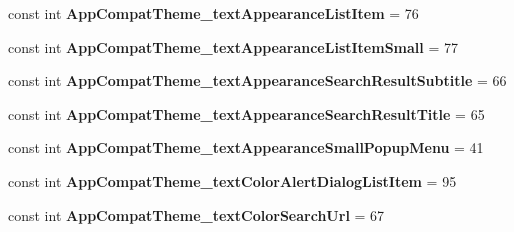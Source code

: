 \begin{DoxyCompactItemize}
\item 
\mbox{\label{class_pinned_app_1_1_droid_1_1_resource_1_1_styleable_ab238d014639b4f1ea101baf3139b3c63}} 
const int {\bfseries App\+Compat\+Theme\+\_\+text\+Appearance\+List\+Item} = 76
\item 
\mbox{\label{class_pinned_app_1_1_droid_1_1_resource_1_1_styleable_a588ab4537eed2ff88de9d317a4784ee8}} 
const int {\bfseries App\+Compat\+Theme\+\_\+text\+Appearance\+List\+Item\+Small} = 77
\item 
\mbox{\label{class_pinned_app_1_1_droid_1_1_resource_1_1_styleable_ae79d0373bdb5c486a0883a2167b149a5}} 
const int {\bfseries App\+Compat\+Theme\+\_\+text\+Appearance\+Search\+Result\+Subtitle} = 66
\item 
\mbox{\label{class_pinned_app_1_1_droid_1_1_resource_1_1_styleable_ab243e77bc42f863ecd968988c8d313fd}} 
const int {\bfseries App\+Compat\+Theme\+\_\+text\+Appearance\+Search\+Result\+Title} = 65
\item 
\mbox{\label{class_pinned_app_1_1_droid_1_1_resource_1_1_styleable_a4cad029daf62ca0328c8880342557645}} 
const int {\bfseries App\+Compat\+Theme\+\_\+text\+Appearance\+Small\+Popup\+Menu} = 41
\item 
\mbox{\label{class_pinned_app_1_1_droid_1_1_resource_1_1_styleable_a1ed6a039646e59c20c56366dbf514cd8}} 
const int {\bfseries App\+Compat\+Theme\+\_\+text\+Color\+Alert\+Dialog\+List\+Item} = 95
\item 
\mbox{\label{class_pinned_app_1_1_droid_1_1_resource_1_1_styleable_af5afdb14a2706a7f2279685337422d94}} 
const int {\bfseries App\+Compat\+Theme\+\_\+text\+Color\+Search\+Url} = 67
\item 
\mbox{\label{class_pinned_app_1_1_droid_1_1_resource_1_1_styleable_aa7f1a67de68b512bbc3d032824c15593}} 

\end{DoxyCompactItemize}
